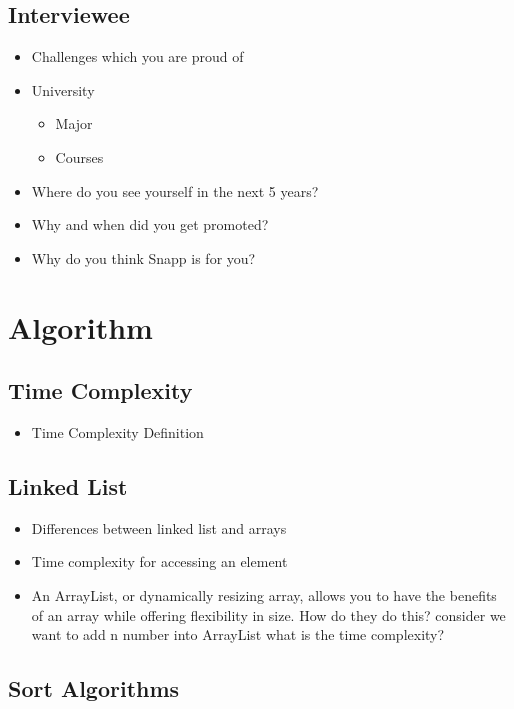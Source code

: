 \documentclass[]{article}
\begin{document}
\begin{multicols}{2}
  \subsection{Interviewee}

  \begin{itemize}
    \item Challenges which you are proud of
    \item University
      \begin{itemize}
        \item Major
        \item Courses
      \end{itemize}
    \item Where do you see yourself in the next 5 years?
    \item Why and when did you get promoted?
    \item Why do you think Snapp is for you?
  \end{itemize}

  \section{Algorithm}

  \subsection{Time Complexity}

  \begin{itemize}
    \item Time Complexity Definition
  \end{itemize}

  \subsection{Linked List}

  \begin{itemize}
    \item Differences between linked list and arrays
    \item Time complexity for accessing an element
    \item An ArrayList, or dynamically resizing array, allows you to have the benefits of an array while offering flexibility in size.
      How do they do this? consider we want to add n number into ArrayList what is the time complexity?
  \end{itemize}

  \subsection{Sort Algorithms}


\end{multicols}
\end{document}
